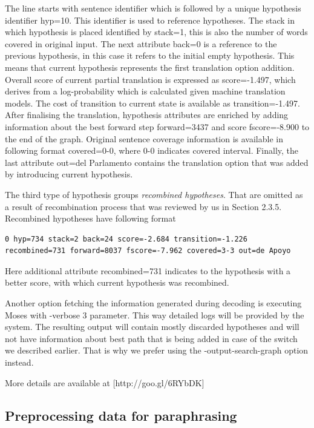 The line starts with sentence identifier which is followed by a unique hypothesis identifier \textsf{hyp=10}. This identifier is used to reference hypotheses. The stack in which hypothesis is placed identified by \textsf{stack=1}, this is also the number of words covered in original input. The next attribute \textsf{back=0} is a reference to the previous hypothesis, in this case it refers to the initial empty hypothesis. This means that current hypothesis represents the first translation option addition. Overall score of current partial translation is expressed as \textsf{score=-1.497}, which derives from a log-probability which is calculated given machine translation models. The cost of transition to current state is available as \textsf{transition=-1.497}. After finalising the translation, hypothesis attributes are enriched by adding information about the best forward step \textsf{forward=3437} and score \textsf{fscore=-8.900} to the end of the graph. Original sentence coverage information is available in following format \textsf{covered=0-0}, where \textsf{0-0} indicates covered interval.
Finally, the last attribute \textsf{out=del Parlamento} contains the translation option that was added by introducing current hypothesis.

The third type of hypothesis groups \textit{recombined hypotheses}. That are omitted as a result of recombination process that was reviewed by us in Section 2.3.5. Recombined hypotheses have following format

\begin{verbatim}
0 hyp=734 stack=2 back=24 score=-2.684 transition=-1.226 
recombined=731 forward=8037 fscore=-7.962 covered=3-3 out=de Apoyo
\end{verbatim}

Here additional attribute \textsf{recombined=731} indicates to the hypothesis with a better score, with which current hypothesis was recombined.

Another option fetching the information generated during decoding is executing Moses with \textsf{-verbose 3} parameter. This way detailed logs will be provided by the system. The resulting output will contain mostly discarded hypotheses and will not have information about best path that is being added in case of the switch we described earlier. That is why we prefer using the \textsf{-output-search-graph} option instead.

More details are available at [http://goo.gl/6RYbDK]

\subsection{Preprocessing data for paraphrasing}

